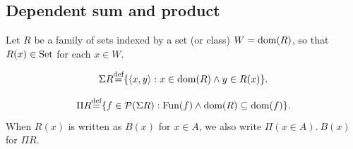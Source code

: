 \documentclass[10pt,a4paper]{article}
\begin{document}
\subsection{Dependent sum and product}
Let $R$ be a family of sets indexed by a set (or class) $W = {\textrm{dom}}(R)$, so that $R(x) \in {\textrm{Set}}$ for each $x \in W$.
\begin{definition}
$$\Sigma R {\stackrel{{\textrm{def}}}{=}} \{\langle x, y\rangle : x \in {\textrm{dom}}(R) \land y\in R(x)\}.$$
\end{definition}
\begin{definition}
$$\Pi R {\stackrel{{\textrm{def}}}{=}} \{ f\in {\mathcal{P}}(\Sigma R) : {\textrm{Fun}}(f) \land {\textrm{dom}}(R)\subseteq {\textrm{dom}}(f)\}.$$
When $R(x)$ is written as $B(x)$ for $x \in A$, we also write $\Pi(x \in A).\ B(x)$ for $\Pi R$.
\end{definition}
\end{document}
